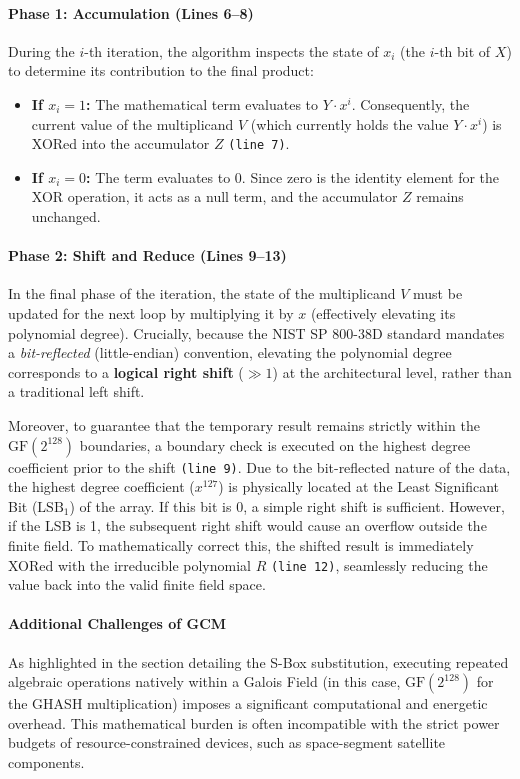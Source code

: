 \documentclass[11pt,a4paper]{report}
\begin{document}
\paragraph{Phase 1: Accumulation (Lines 6--8)}
During the $i$-th iteration, the algorithm inspects the state of $x_i$ (the $i$-th bit of $X$) to determine its contribution to the final product:
\begin{itemize}
    \item \textbf{If $x_i = 1$:} The mathematical term evaluates to $Y \cdot x^i$. Consequently, the current value of the multiplicand $V$ (which currently holds the value $Y \cdot x^i$) is XORed into the accumulator $Z$ \texttt{(line 7)}.
    \item \textbf{If $x_i = 0$:} The term evaluates to $0$. Since zero is the identity element for the XOR operation, it acts as a null term, and the accumulator $Z$ remains unchanged.
\end{itemize}

\paragraph{Phase 2: Shift and Reduce (Lines 9--13)}
In the final phase of the iteration, the state of the multiplicand $V$ must be updated for the next loop by multiplying it by $x$ (effectively elevating its polynomial degree). 
Crucially, because the NIST SP 800-38D standard mandates a \textit{bit-reflected} (little-endian) convention, elevating the polynomial degree corresponds to a \textbf{logical right shift} ($\gg 1$) at the architectural level, rather than a traditional left shift.

Moreover, to guarantee that the temporary result remains strictly within the $\mathrm{GF}(2^{128})$ boundaries, a boundary check is executed on the highest degree coefficient prior to the shift \texttt{(line 9)}. 
Due to the bit-reflected nature of the data, the highest degree coefficient ($x^{127}$) is physically located at the Least Significant Bit ($\text{LSB}_1$) of the array. 
If this bit is 0, a simple right shift is sufficient. However, if the LSB is 1, the subsequent right shift would cause an overflow outside the finite field. 
To mathematically correct this, the shifted result is immediately XORed with the irreducible polynomial $R$ \texttt{(line 12)}, seamlessly reducing the value back into the valid finite field space.

\paragraph{Additional Challenges of GCM}
As highlighted in the section detailing the S-Box substitution, executing repeated algebraic operations natively within a Galois Field (in this case, $\mathrm{GF}(2^{128})$ for the GHASH multiplication) imposes a significant computational and energetic overhead. 
This mathematical burden is often incompatible with the strict power budgets of resource-constrained devices, such as space-segment satellite components.
\end{document}
